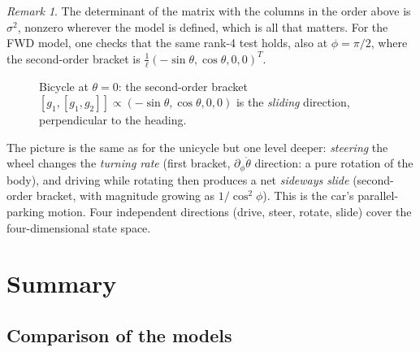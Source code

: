\documentclass[11pt,a4paper]{article}
\newcommand{\LB}[2]{[#1,#2]}
\theoremstyle{plain}
\theoremstyle{definition}
\theoremstyle{remark}
\newtheorem*{remark}{Remark}
\newcommand{\wheel}[3]{\begin{scope}[shift={#1},rotate=#2]
  \draw[fill=#3,rounded corners=1pt] (-0.4,-0.12) rectangle (0.4,0.12);\end{scope}}
\begin{document}
\begin{remark}
The determinant of the matrix with the columns in the order above is $\sigma^2$, nonzero wherever the model is defined, which is all that matters.
For the FWD model, one checks that the same rank-4 test holds, also at $\phi=\pi/2$, where the second-order bracket is $\frac1\ell(-\sin\theta,\cos\theta,0,0)^T$.
\end{remark}

\begin{figure}[H]
\centering
{}
\caption{Bicycle at $\theta=0$: the second-order bracket $\LB{g_1}{\LB{g_1}{g_2}}\propto(-\sin\theta,\cos\theta,0,0)$ is the \emph{sliding} direction, perpendicular to the heading.}
\end{figure}

\begin{intuition}
The picture is the same as for the unicycle but one level deeper: \emph{steering} the wheel changes the \emph{turning rate} (first bracket, $\partial_\phi\dot\theta$ direction: a pure rotation of the body), and driving while rotating then produces a net \emph{sideways slide} (second-order bracket, with magnitude growing as $1/\cos^2\phi$). This is the car's parallel-parking motion. Four independent directions (drive, steer, rotate, slide) cover the four-dimensional state space.
\end{intuition}

\section{Summary}

\subsection{Comparison of the models}
\end{document}
